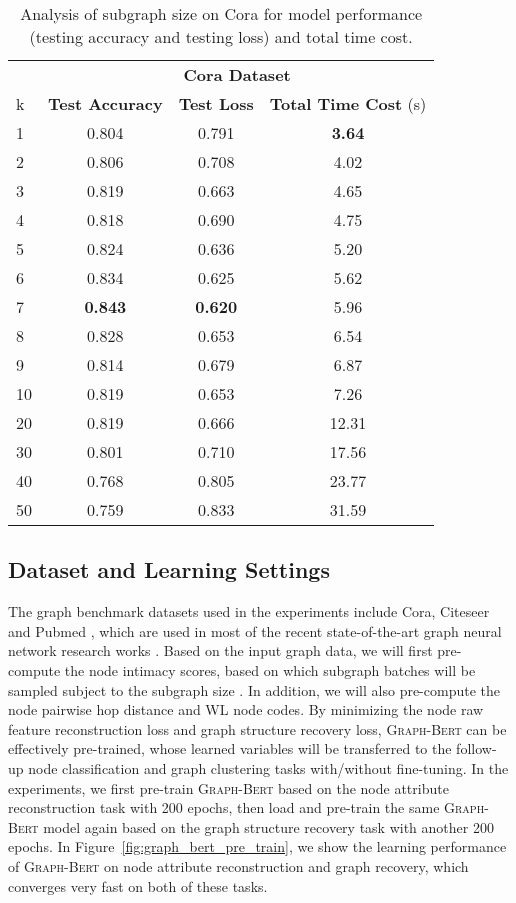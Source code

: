 \documentclass{article}
\newcommand{\our}{\textsc{Graph-Bert}}
\begin{document}
\begin{table}[t]
\caption{Analysis of subgraph size  on Cora for model performance (testing accuracy and testing loss) and total time cost.}\label{tab:k_analysis}
 \small
\centering
\setlength{\tabcolsep}{6pt}
\begin{tabular}{|l|c|c|c|}
\hline
 & \multicolumn{3}{|c|}{\textbf{Cora Dataset}} \\
\cline{2-4}
{k }& {\textbf{Test Accuracy}} & {\textbf{Test Loss}} & {\textbf{Total Time Cost} (s)} \\
\hline 
\hline 
1&0.804  &0.791  &\textbf{3.64}   \\
\cline{2-4}
2&0.806  &0.708  &4.02   \\
\cline{2-4}
3&0.819  &0.663  &4.65   \\
\cline{2-4}
4&0.818&0.690  &4.75   \\
\cline{2-4}
5&0.824  &0.636  &5.20   \\
\cline{2-4}
6&0.834 &0.625  &5.62   \\
\cline{2-4}
7&\textbf{0.843} &\textbf{0.620}  &5.96   \\
\cline{2-4}
8&0.828  &0.653  &6.54   \\
\cline{2-4}
9&0.814  &0.679  &6.87   \\
\cline{2-4}
10&0.819 &0.653  &7.26   \\
\cline{2-4}
20&0.819 &0.666  &12.31   \\
\cline{2-4}
30&0.801 &0.710  &17.56   \\
\cline{2-4}
40&0.768 &0.805  &23.77   \\
\cline{2-4}
50&0.759 &0.833  &31.59   \\
\hline
\end{tabular}
\end{table}


\subsection{Dataset and Learning Settings}

The graph benchmark datasets used in the experiments include Cora, Citeseer and Pubmed \cite{YCS16}, which are used in most of the recent state-of-the-art graph neural network research works \cite{Kipf_Semi_CORR_16,Velickovic_Graph_ICLR_18,Zhang2019GResNetGR}. Based on the input graph data, we will first pre-compute the node intimacy scores, based on which subgraph batches will be sampled subject to the subgraph size . In addition, we will also pre-compute the node pairwise hop distance and WL node codes. By minimizing the node raw feature reconstruction loss and graph structure recovery loss, {\our} can be effectively pre-trained, whose learned variables will be transferred to the follow-up node classification and graph clustering tasks with/without fine-tuning. In the experiments, we first pre-train {\our} based on the node attribute reconstruction task with 200 epochs, then load and pre-train the same {\our} model again based on the graph structure recovery task with another 200 epochs. In Figure~\ref{fig:graph_bert_pre_train}, we show the learning performance of {\our} on node attribute reconstruction and graph recovery, which converges very fast on both of these tasks.
\end{document}
